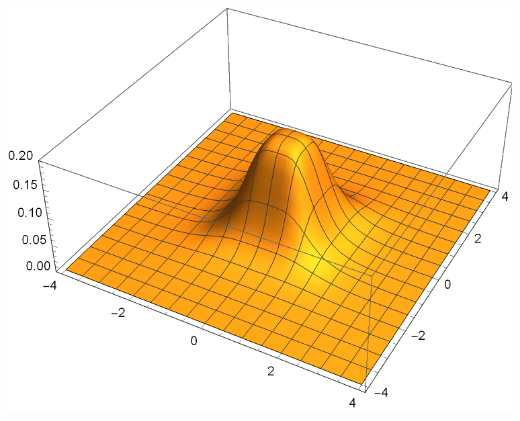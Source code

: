 \documentclass{tstextbook}
\begin{document}
\includegraphics[scale=0.7, center]{images/joint_probability_distribution.pdf}
\end{document}
